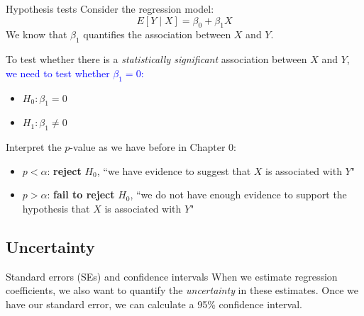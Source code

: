 \documentclass[10pt,t]{beamer}
\begin{document}
\begin{frame}{Hypothesis tests}
Consider the regression model:
$$
E[Y \mid X] = \beta_0 + \beta_1 X
$$
We know that $\beta_1$ quantifies the association between $X$ and $Y$.

\vspace{0.3cm}

To test whether there is a \textit{statistically significant} association between $X$ and $Y$, \textcolor{blue}{we need to test whether $\beta_1 = 0$:}

\begin{itemize}
	\item $H_0: \beta_1 = 0$
	\item $H_1: \beta_1 \neq 0$
\end{itemize} \pause

\vspace{0.3cm}

Interpret the $p$-value as we have before in Chapter 0:
\begin{itemize}
	\item $p < \alpha$: \textbf{reject} $H_0$, ``we have evidence to suggest that $X$ is associated with $Y$"
	\item $p > \alpha$: \textbf{fail to reject} $H_0$, ``we do not have enough evidence to support the hypothesis that $X$ is associated with $Y$"
\end{itemize}

\end{frame}

\subsection{Uncertainty}

\begin{frame}{Standard errors (SEs) and confidence intervals}
When we estimate regression coefficients, we also want to quantify the \textit{uncertainty} in these estimates. Once we have our standard error, we can calculate a 95\% confidence interval.


\end{frame}
\end{document}
